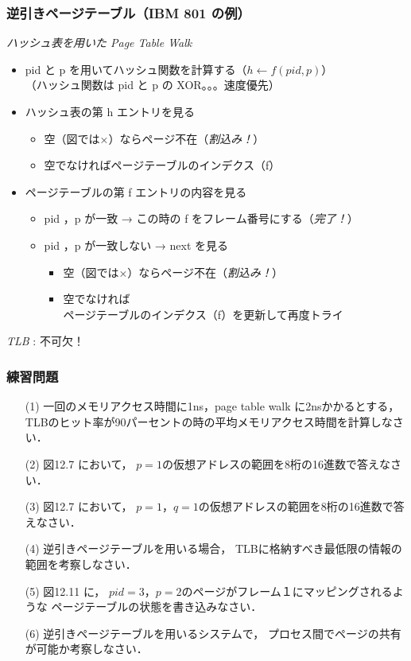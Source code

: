 \documentclass{beamer}                   %
\begin{document}
\begin{frame}
  \frametitle{逆引きページテーブル（IBM 801 の例）}
  \emph{ハッシュ表を用いた Page Table Walk}
  \begin{itemize}
  \item pid と p を用いてハッシュ関数を計算する（$h \leftarrow f(pid, p)$）\\
    （ハッシュ関数は pid と p の XOR。。。速度優先）
    \vfill
  \item ハッシュ表の第 h エントリを見る
    \begin{itemize}
      \item 空（図では×）ならページ不在（\emph{割込み！}）
      \item 空でなければページテーブルのインデクス（f）
    \end{itemize}
    \vfill
  \item ページテーブルの第 f エントリの内容を見る
    \begin{itemize}
      \item pid ，p が一致 →  この時の f をフレーム番号にする（\emph{完了！}）
      \item pid ，p が一致しない →  next を見る
        \begin{itemize}
        \item 空（図では×）ならページ不在（\emph{割込み！}）
        \item 空でなければ\\ 
          ページテーブルのインデクス（f）を更新して再度トライ
        \end{itemize}
    \end{itemize}
  \end{itemize}

  \emph{TLB} : 不可欠！
\end{frame}

\begin{frame}
  \frametitle{練習問題}
  \begin{enumerate}
  \item[(1)] 一回のメモリアクセス時間に1ns，page table walk に2nsかかるとする，
    TLBのヒット率が90パーセントの時の平均メモリアクセス時間を計算しなさい．
  \item[(2)] 図12.7 において，
    $p=1$の仮想アドレスの範囲を8桁の16進数で答えなさい．
  \item[(3)] 図12.7 において，
    $p=1$，$q=1$の仮想アドレスの範囲を8桁の16進数で答えなさい．
  \item[(4)] 逆引きページテーブルを用いる場合，
    TLBに格納すべき最低限の情報の範囲を考察しなさい．
  \item[(5)] 図12.11 に，
    $pid=3$，$p=2$のページがフレーム１にマッピングされるような
    ページテーブルの状態を書き込みなさい．
  \item[(6)] 逆引きページテーブルを用いるシステムで，
    プロセス間でページの共有が可能か考察しなさい．
  \end{enumerate}
\end{frame}
\end{document}
